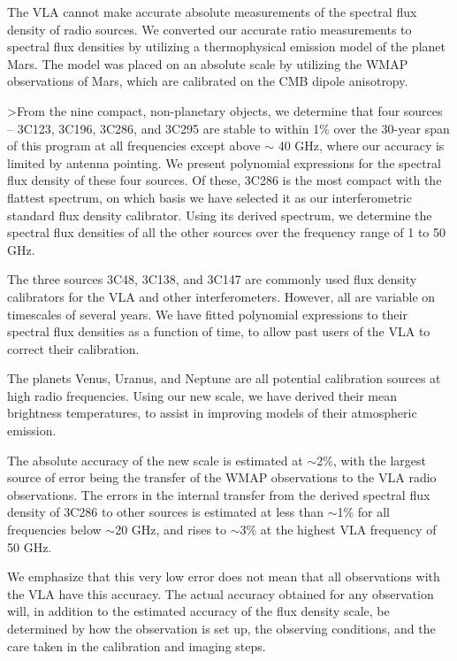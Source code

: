 \documentclass{aastex}
\begin{document}
The VLA cannot make accurate absolute measurements of the spectral
flux density of radio sources.  We converted our accurate ratio measurements to
spectral flux densities by utilizing a thermophysical emission model
of the planet Mars.  The model was placed on an absolute
scale by utilizing the WMAP observations of Mars, which are calibrated
on the CMB dipole anisotropy.

>From the nine compact, non-planetary objects, we determine that four
sources -- 3C123, 3C196, 3C286, and 3C295 are stable to within 1\%
over the 30-year span of this program at all frequencies except above
$\sim$ 40 GHz, where our accuracy is limited by antenna pointing.  We
present polynomial expressions for the spectral flux density of these
four sources.  Of these, 3C286 is the most compact with the
flattest spectrum, on which basis we have selected it as our
interferometric standard flux density calibrator.  Using its derived
spectrum, we determine the spectral flux densities of all the other
sources over the frequency range of 1 to 50 GHz.

The three sources 3C48, 3C138, and 3C147 are commonly used flux
density calibrators for the VLA and other interferometers.  However,
all are variable on timescales of several years.  We have fitted
polynomial expressions to their spectral flux densities as a function
of time, to allow past users of the VLA to correct their calibration.  

The planets Venus, Uranus, and Neptune are all potential calibration
sources at high radio frequencies.  Using our new scale, we have
derived their mean brightness temperatures, to assist in improving
models of their atmospheric emission.  

The absolute accuracy of the new scale is estimated at $\sim$2\%, with
the largest source of error being the transfer of the WMAP
observations to the VLA radio observations.  The errors in the
internal transfer from the derived spectral flux density of 3C286 to
other sources is estimated at less than $\sim$1\% for all frequencies
below $\sim$20 GHz, and rises to $\sim$3\% at the highest VLA
frequency of 50 GHz.  

We emphasize that this very low error does not mean that all
observations with the VLA have this accuracy.  The actual accuracy
obtained for any observation will, in addition to the estimated
accuracy of the flux density scale, be determined by how the
observation is set up, the observing conditions, and the care taken in
the calibration and imaging steps.
\end{document}
